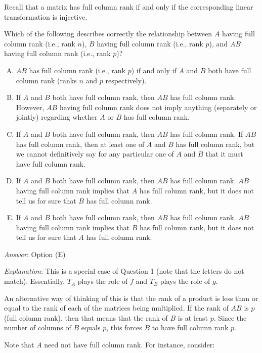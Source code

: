 \documentclass[10pt]{amsart}
\begin{document}
\begin{enumerate}
  Recall that a matrix has full column rank if and only if the
  corresponding linear transformation is injective.

  Which of the following describes correctly the relationship between
  $A$ having full column rank (i.e., rank $n$), $B$ having full column
  rank (i.e., rank $p$), and $AB$ having full column rank (i.e., rank
  $p$)?

  \begin{enumerate}[(A)]
  \item $AB$ has full column rank (i.e., rank $p$) if and only if $A$
    and $B$ both have full column rank (ranks $n$ and $p$
    respectively).
  \item If $A$ and $B$ both have full column rank, then $AB$ has full
    column rank. However, $AB$ having full column rank does not imply
    anything (separately or jointly) regarding whether $A$ or $B$ has
    full column rank.
  \item If $A$ and $B$ both have full column rank, then $AB$ has full
    column rank. If $AB$ has full column rank, then at least one of
    $A$ and $B$ has full column rank, but we cannot definitively say
    for any particular one of $A$ and $B$ that it must have full column
    rank.
  \item If $A$ and $B$ both have full column rank, then $AB$ has full
    column rank. $AB$ having full column rank implies that $A$ has
    full column rank, but it does not tell us for sure that $B$ has
    full column rank.
  \item If $A$ and $B$ both have full column rank, then $AB$ has full
    column rank. $AB$ having full column rank implies that $B$ has
    full column rank, but it does not tell us for sure that $A$ has
    full column rank.
  \end{enumerate}

  {\em Answer}: Option (E)

  {\em Explanation}: This is a special case of Question 1 (note that
  the letters do not match). Essentially, $T_A$ plays the role of $f$
  and $T_B$ plays the role of $g$.

  An alternative way of thinking of this is that the rank of a product
  is less than or equal to the rank of each of the matrices being
  multiplied. If the rank of $AB$ is $p$ (full column rank), then that
  means that the rank of $B$ is at least $p$. Since the number of
  columns of $B$ equals $p$, this forces $B$ to have full column rank
  $p$.

  Note that $A$ need not have full column rank. For instance, consider:


\end{enumerate}
\end{document}
